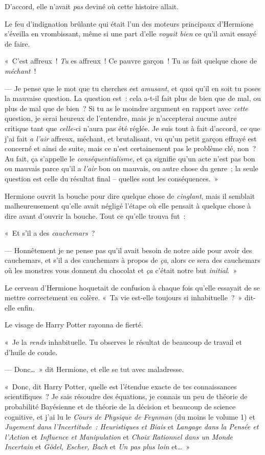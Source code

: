 D'accord, elle n'avait \emph{pas} deviné où cette histoire allait.

Le feu d'indignation brûlante qui était l'un des moteurs principaux d'Hermione s'éveilla en vrombissant, même si une part d'elle \emph{voyait bien} ce qu'il avait essayé de faire.

«~C'est affreux~! \emph{Tu} es affreux~! Ce pauvre garçon~! Tu as fait quelque chose de \emph{méchant}~!

--- Je pense que le mot que tu cherches est \emph{amusant}, et quoi qu'il en soit tu poses la mauvaise question. La question est~: cela a-t-il fait plus de bien que de mal, ou plus de mal que de bien~? Si tu as le moindre argument en rapport avec \emph{cette} question, je serai heureux de l'entendre, mais je n'accepterai aucune autre critique tant que \emph{celle-}ci n'aura pas été réglée. Je suis tout à fait d'accord, ce que j'ai fait \emph{a l'air} affreux, méchant, et brutalisant, vu qu'un petit garçon effrayé est concerné et ainsi de suite, mais ce n'est certainement pas le problème clé, non~? Au fait, ça s'appelle le \emph{conséquentialisme}, et ça signifie qu'un acte n'est pas bon ou mauvais parce qu'il a \emph{l'air} bon ou mauvais, ou autre chose du genre~; la seule question est celle du résultat final -- quelles sont les conséquences.~»

Hermione ouvrit la bouche pour dire quelque chose de \emph{cinglant}, mais il semblait malheureusement qu'elle avait négligé l'étape où elle pensait à quelque chose à dire avant d'ouvrir la bouche. Tout ce qu'elle trouva fut~:

«~Et s'il a des \emph{cauchemars}~?

--- Honnêtement je ne pense pas qu'il avait besoin de notre aide pour avoir des cauchemars, et s'il a des cauchemars à propos de \emph{ça}, alors ce sera des cauchemars où les monstres vous donnent du chocolat et \emph{ça} c'était notre but \emph{initial}.~»

Le cerveau d'Hermione hoquetait de confusion à chaque fois qu'elle essayait de se mettre correctement en colère. «~Ta vie est-elle toujours si inhabituelle~?~» dit-elle enfin.

Le visage de Harry Potter rayonna de fierté.

«~Je la \emph{rends} inhabituelle. Tu observes le résultat de beaucoup de travail et d'huile de coude.

--- Donc…~» dit Hermione, et elle se tut avec maladresse.

«~Donc, dit Harry Potter, quelle est l'étendue exacte de tes connaissances scientifiques~? Je sais résoudre des équations, je connais un peu de théorie de probabilité Bayésienne et de théorie de la décision et beaucoup de science cognitive, et j'ai lu le \emph{Cours de Physique de Feynman} (du moins le volume 1) et \emph{Jugement dans l'Incertitude~: Heuristiques et Biais} et \emph{Langage dans la Pensée et l'Action} et \emph{Influence et Manipulation} et \emph{Choix Rationnel dans un Monde Incertain} et \emph{Gödel, Escher, Bach} et \emph{Un pas plus loin} et…~»

